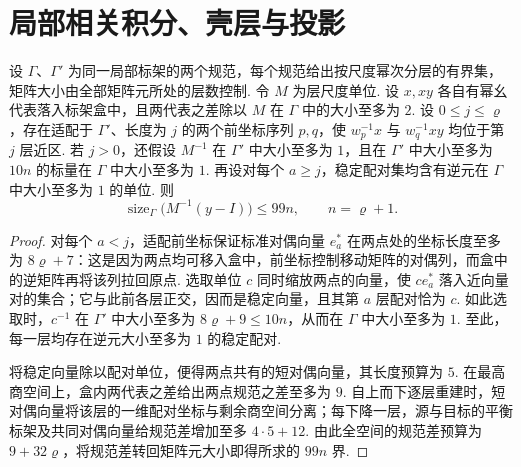 \section{局部相关积分、壳层与投影}
\label{sec:b-local-mass}

\begin{lemma}[由稳定配对重构相对位置矩阵]
\label{lem:b-frame-matrix-reconstruction}
\emitthmsource
设 $\Gamma$、$\Gamma'$ 为同一局部标架的两个规范，每个规范给出按尺度幂次分层的有界集，矩阵大小由全部矩阵元所处的层数控制. 令 $M$ 为层尺度单位.
设 $x,xy$ 各自有幂幺代表落入标架盒中，且两代表之差除以 $M$ 在 $\Gamma$ 中的大小至多为 $2$.
设 $0\le j\le\varrho$，存在适配于 $\Gamma'$、长度为 $j$ 的两个前坐标序列 $p,q$，使 $w_p^{-1}x$ 与 $w_q^{-1}xy$ 均位于第 $j$ 层近区.
若 $j>0$，还假设 $M^{-1}$ 在 $\Gamma'$ 中大小至多为 $1$，且在 $\Gamma'$ 中大小至多为 $10n$ 的标量在 $\Gamma$ 中大小至多为 $1$.
再设对每个 $a\ge j$，稳定配对集均含有逆元在 $\Gamma$ 中大小至多为 $1$ 的单位. 则
\[
  \operatorname{size}_{\Gamma}\bigl(M^{-1}(y-I)\bigr)\le 99n,
  \qquad n=\varrho+1.
\]
\end{lemma}

\begin{proof}
对每个 $a<j$，适配前坐标保证标准对偶向量 $e_a^\ast$ 在两点处的坐标长度至多为 $8\varrho+7$：这是因为两点均可移入盒中，前坐标控制移动矩阵的对偶列，而盒中的逆矩阵再将该列拉回原点. 选取单位 $c$ 同时缩放两点的向量，使 $c e_a^\ast$ 落入近向量对的集合；它与此前各层正交，因而是稳定向量，且其第 $a$ 层配对恰为 $c$. 如此选取时，$c^{-1}$ 在 $\Gamma'$ 中大小至多为 $8\varrho+9\le10n$，从而在 $\Gamma$ 中大小至多为 $1$. 至此，每一层均存在逆元大小至多为 $1$ 的稳定配对.

将稳定向量除以配对单位，便得两点共有的短对偶向量，其长度预算为 $5$. 在最高商空间上，盒内两代表之差给出两点规范之差至多为 $9$. 自上而下逐层重建时，短对偶向量将该层的一维配对坐标与剩余商空间分离；每下降一层，源与目标的平衡标架及共同对偶向量给规范差增加至多 $4\cdot5+12$. 由此全空间的规范差预算为 $9+32\varrho$，将规范差转回矩阵元大小即得所求的 $99n$ 界.
\end{proof}

